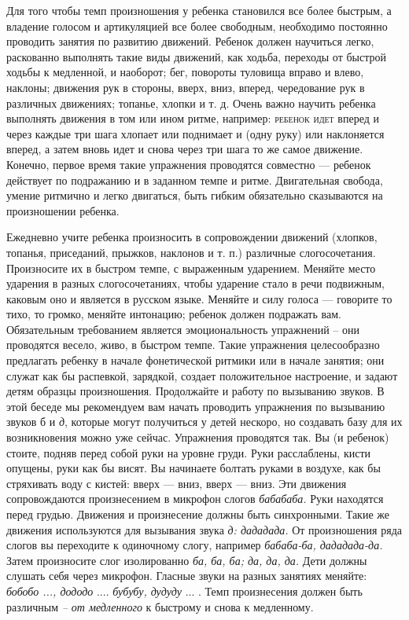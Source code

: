 \documentclass[a5paper]{book}
\renewcommand{\emph}[1]{\textit{#1}}
\begin{document}
Для того чтобы темп произношения у ребенка становился все более быстрым,
а владение голосом и артикуляцией все более свободным, необходимо
постоянно проводить занятия по развитию движений. Ребенок должен
научиться легко, раскованно выполнять такие виды движений, как ходьба,
переходы от быстрой ходьбы к медленной, и наоборот; бег, повороты
туловища вправо и влево, наклоны; движения рук в стороны, вверх, вниз,
вперед, чередование рук в различных движениях; топанье, хлопки и т. д.
Очень важно научить ребенка выполнять движения в том или ином ритме,
например: \textsc{ребенок идет} вперед и через каждые три шага хлопает
или поднимает и (одну руку) или наклоняется вперед, а затем вновь идет и
снова через три шага то же самое движение. Конечно, первое время такие
упражнения проводятся совместно --- ребенок действует по подражанию и в
заданном темпе и ритме. Двигательная свобода, умение ритмично и легко
двигаться, быть гибким обязательно сказываются на произношении ребенка.

Ежедневно учите ребенка произносить в сопровождении движений (хлопков,
топанья, приседаний, прыжков, наклонов и т. п.) различные
слогосочетания. Произносите их в быстром темпе, с выраженным ударением.
Меняйте место ударения в разных слогосочетаниях, чтобы ударение стало в
речи подвижным, каковым оно и является в русском языке. Меняйте и силу
голоса --- говорите то тихо, то громко, меняйте интонацию; ребенок
должен подражать вам. Обязательным требованием является эмоциональность
упражнений -- они проводятся весело, живо, в быстром темпе. Такие
упражнения целесообразно предлагать ребенку в начале фонетической
ритмики или в начале занятия; они служат как бы распевкой, зарядкой,
создает положительное настроение, и задают детям образцы произношения.
Продолжайте и работу по вызыванию звуков. В этой беседе мы рекомендуем
вам начать проводить упражнения по вызыванию звуков б и \emph{д},
которые могут получиться у детей нескоро, но создавать базу для их
возникновения можно уже сейчас. Упражнения проводятся так. Вы (и
ребенок) стоите, подняв перед собой руки на уровне груди. Руки
расслаблены, кисти опущены, руки как бы висят. Вы начинаете болтать
руками в воздухе, как бы стряхивать воду с кистей: вверх --- вниз, вверх
--- вниз. Эти движения сопровождаются произнесением в микрофон слогов
\emph{бабабаба.} Руки находятся перед грудью. Движения и произнесение
должны быть синхронными. Такие же движения используются для вызывания
звука \emph{д: дададада.} От произношения ряда слогов вы переходите к
одиночному слогу, например \emph{бабаба-ба, дададада-да.} Затем
произносите слог изолированно \emph{ба, ба, ба; да, да, да.} Дети должны
слушать себя через микрофон. Гласные звуки на разных занятиях меняйте:
\emph{бобобо ..., дододо} .... \emph{бубубу, дудуду} ... . Темп
произнесения должен быть различным \emph{-- от медленного} к быстрому и
снова к медленному.
\end{document}
